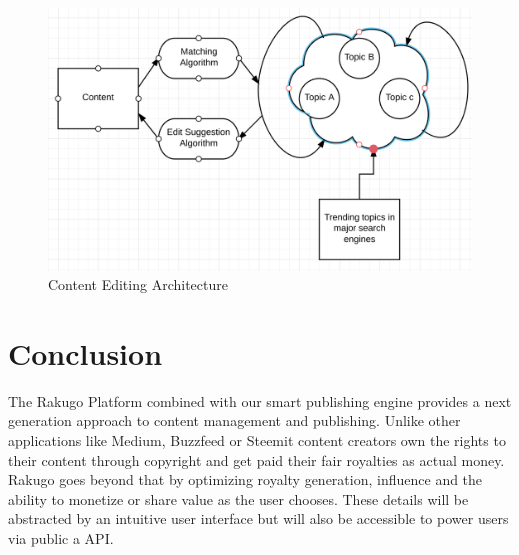\documentclass{article}
\begin{document}
\begin{figure}[H]
\centering
\includegraphics[scale=0.60]{smart_publishing_engine.png}
\caption{Content Editing Architecture}
\end{figure}

\section{Conclusion}
The Rakugo Platform combined with our smart publishing engine provides a next generation approach to content management and publishing. Unlike other applications like Medium, Buzzfeed or Steemit content creators own the rights to their content through copyright and get paid their fair royalties as actual money. Rakugo goes beyond that by optimizing royalty generation, influence and the ability to monetize or share value as the user chooses. These details will be abstracted by an intuitive user interface but will also be accessible to power users via public a API.


\end{document}
